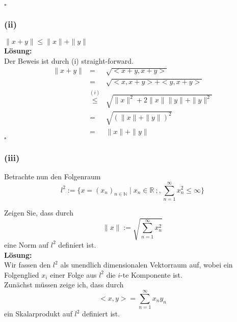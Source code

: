 \mbox{}\hfill$\square$

\subsubsection*{(ii)}
$\| x + y \| \leq \| x \| + \| y \|$\\
\textbf{Lösung:}\\


Der Beweis ist durch (i) straight-forward.
$$\begin{array}{rcl}
    \| x + y \| &=& \sqrt{ < x + y, x + y> }\\
                &=& \sqrt{ <x, x + y> + <y , x + y> }\\
                &\stackrel{(i)}{\leq}& \sqrt{\| x \|^2 + 2 \| x \| \| y \| + \| y \|^2 }\\
                &=& \sqrt{ (\| x \| + \| y \|)^2 }\\
                &=& \| x \| + \| y \|
\end{array}$$
\mbox{}\hfill$\square$

\subsubsection*{(iii)}
Betrachte nun den Folgenraum
$$
    l^2 := \{ x = (x_n)_{n \in \mathbb{N}} \; | \; x_n \in \mathbb{R}\ ; , \overset{\infty}{\underset{n=1}{\sum}} x_n^2 \leq \infty \}
$$

Zeigen Sie, dass durch
$$
    \| x \| := \sqrt{\sum^\infty_{n=1} x_n^2}
$$
eine Norm auf $l^2$ definiert ist.\\

\textbf{Lösung:}\\

Wir fassen den $l^2$ als unendlich dimensionalen Vektorraum auf, wobei ein Folgenglied $x_i$ einer Folge aus $l^2$ die $i$-te
Komponente ist.\\

Zunächst müssen zeige ich, dass durch
$$
<x,y> = \sum^\infty_{n=1} x_n y_n
$$
ein Skalarprodukt auf $l^2$ definiert ist.

